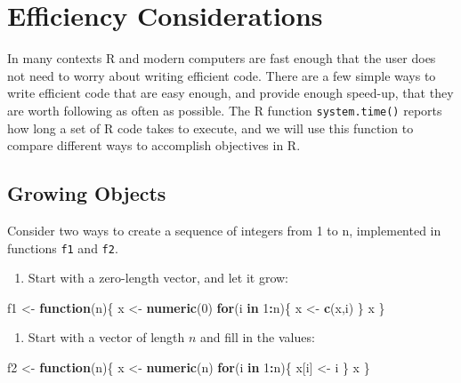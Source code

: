 \documentclass[
]{krantz}
\makeatletter
\newenvironment{Shaded}{\begin{snugshade}}{\end{snugshade}}
\newcommand{\ControlFlowTok}[1]{\textcolor[rgb]{0.27,0.27,0.27}{\textbf{#1}}}
\newcommand{\DecValTok}[1]{\textcolor[rgb]{0.06,0.06,0.06}{#1}}
\newcommand{\KeywordTok}[1]{\textcolor[rgb]{0.27,0.27,0.27}{\textbf{#1}}}
\newcommand{\NormalTok}[1]{#1}
\newcommand{\OperatorTok}[1]{\textcolor[rgb]{0.43,0.43,0.43}{\textbf{#1}}}
\newcommand{\StringTok}[1]{\textcolor[rgb]{0.5,0.5,0.5}{#1}}
\providecommand{\tightlist}{%
  \setlength{\itemsep}{0pt}\setlength{\parskip}{0pt}}
\newenvironment{kframe}{%
\medskip{}
\setlength{\fboxsep}{.8em}
 \def\at@end@of@kframe{}%
 \ifinner\ifhmode%
  \def\at@end@of@kframe{\end{minipage}}%
  \begin{minipage}{\columnwidth}%
 \fi\fi%
 \def\FrameCommand##1{\hskip\@totalleftmargin \hskip-\fboxsep
 \colorbox{shadecolor}{##1}\hskip-\fboxsep
     \hskip-\linewidth \hskip-\@totalleftmargin \hskip\columnwidth}%
 \MakeFramed {\advance\hsize-\width
   \@totalleftmargin\z@ \linewidth\hsize
   \@setminipage}}%
 {\par\unskip\endMakeFramed%
 \at@end@of@kframe}
\renewenvironment{Shaded}{\begin{kframe}}{\end{kframe}}
\makeatother
\begin{document}
\hypertarget{efficiency-considerations}{%
\section{Efficiency Considerations}\label{efficiency-considerations}}

In many contexts R and modern computers are fast enough that the user does not need to worry about writing efficient code. There are a few simple ways to write efficient code that are easy enough, and provide enough speed-up, that they are worth following as often as possible. The R function \texttt{system.time()} reports how long a set of R code takes to execute, and we will use this function to compare different ways to accomplish objectives in R.

\hypertarget{growing-objects}{%
\subsection{Growing Objects}\label{growing-objects}}

Consider two ways to create a sequence of integers from 1 to n, implemented in functions \texttt{f1} and \texttt{f2}.

\begin{enumerate}
\def\labelenumi{\arabic{enumi}.}
\tightlist
\item
  Start with a zero-length vector, and let it grow:
\end{enumerate}

\begin{Shaded}
\begin{Highlighting}[]
\NormalTok{f1 \textless{}{-}}\StringTok{ }\ControlFlowTok{function}\NormalTok{(n)\{}
\NormalTok{    x \textless{}{-}}\StringTok{ }\KeywordTok{numeric}\NormalTok{(}\DecValTok{0}\NormalTok{)}
    \ControlFlowTok{for}\NormalTok{(i }\ControlFlowTok{in} \DecValTok{1}\OperatorTok{:}\NormalTok{n)\{}
\NormalTok{        x \textless{}{-}}\StringTok{ }\KeywordTok{c}\NormalTok{(x,i)}
\NormalTok{    \}}
\NormalTok{    x}
\NormalTok{\}}
\end{Highlighting}
\end{Shaded}

\begin{enumerate}
\def\labelenumi{\arabic{enumi}.}
\setcounter{enumi}{1}
\tightlist
\item
  Start with a vector of length \(n\) and fill in the values:
\end{enumerate}

\begin{Shaded}
\begin{Highlighting}[]
\NormalTok{f2 \textless{}{-}}\StringTok{ }\ControlFlowTok{function}\NormalTok{(n)\{}
\NormalTok{    x \textless{}{-}}\StringTok{ }\KeywordTok{numeric}\NormalTok{(n)}
    \ControlFlowTok{for}\NormalTok{(i }\ControlFlowTok{in} \DecValTok{1}\OperatorTok{:}\NormalTok{n)\{}
\NormalTok{        x[i] \textless{}{-}}\StringTok{ }\NormalTok{i}
\NormalTok{    \}}
\NormalTok{    x}
\NormalTok{\}}
\end{Highlighting}
\end{Shaded}
\end{document}
